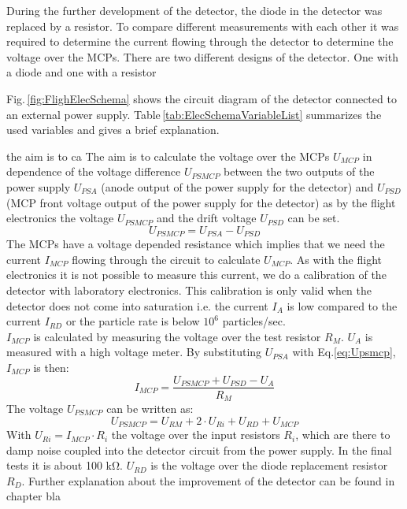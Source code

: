 		
		
		During the further development of the detector, the diode in the detector was replaced by a resistor. To compare different measurements with each other it was required to determine the current flowing through the detector to determine the voltage over the MCPs.
		There are two different designs of the detector. One with a diode and one with a resistor
		
		Fig.\,\ref{fig:FlighElecSchema} shows the circuit diagram of the detector connected to an external power supply. Table\,\ref{tab:ElecSchemaVariableList} summarizes the used variables and gives a brief explanation.
		
		
		the aim is to ca		
		The aim is to calculate the voltage over the MCPs $U_{MCP}$ in dependence of the voltage difference $U_{PSMCP}$ between the two outputs of the power supply $U_{PSA}$ (anode output of the power supply for the detector) and $U_{PSD}$ (MCP front voltage output of the power supply for the detector) as by the flight electronics the voltage $U_{PSMCP}$ and the drift voltage $U_{PSD}$ can be set.\\
		\begin{equation}
			U_{PSMCP} = U_{PSA} - U_{PSD}
			\label{eq:Upsmcp}
		\end{equation} %
		The MCPs have a voltage depended resistance which implies that we need the current $I_{MCP}$ flowing through the circuit to calculate $U_{MCP}$. As with the flight electronics it is not possible to measure this current, we do a calibration of the detector with laboratory electronics. This calibration is only valid when the detector does not come into saturation i.e. the current $I_A$ is low compared to the current $I_{RD}$ or the particle rate is below $10^6$ particles/sec.\\ %
		$I_{MCP}$ is calculated by measuring the voltage over the test resistor $R_M$. $U_A$ is measured with a high voltage meter. By substituting $U_{PSA}$ with Eq.\eqref{eq:Upsmcp}, $I_{MCP}$ is then:
		\begin{equation}
			I_{MCP} = \frac{U_{PSMCP} + U_{PSD}-U_A}{R_M}
		\end{equation}
		The voltage $U_{PSMCP}$ can be written as:
		\begin{equation}
			U_{PSMCP} = U_{RM} + 2\cdot U_{Ri} + U_{RD} + U_{MCP}
			\label{eq:UpsmcpTot}
		\end{equation}
		With $U_{Ri} = I_{MCP}\cdot R_i$ the voltage over the input resistors $R_i$, which are there to damp noise coupled into the detector circuit from the power supply. In the final tests it is about 100 \si{\kilo\ohm}. $U_{RD}$ is the voltage over the diode replacement resistor $R_D$. Further explanation about the improvement of the detector can be found in chapter bla %
